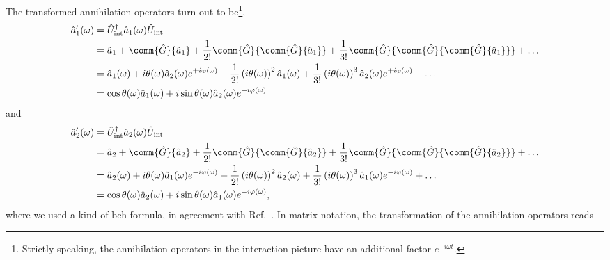 The transformed annihilation operators turn out to be\footnote{Strictly speaking, the annihilation operators in the interaction picture have an additional factor $e^{-i\omega t}$.},
\begin{equation}
	\begin{split}
		\hat{a}_1^\prime(\omega)
		&=
		\hat{U}_\text{int}^\dagger
		\hat{a}_1(\omega)
		\hat{U}_\text{int}
		\\
		&=
		\hat{a}_1
		+
		\comm{\hat{G}}{\hat{a}_1}
		+
		\frac{1}{2!}
		\comm{\hat{G}}{\comm{\hat{G}}{\hat{a}_1}}
		+
		\frac{1}{3!}
		\comm{\hat{G}}{\comm{\hat{G}}{\comm{\hat{G}}{\hat{a}_1}}}
		+
		\dots
		\\
		&=
		\hat{a}_1(\omega)
		+
		i\theta(\omega)
		\hat{a}_2(\omega)
		e^{+i\varphi(\omega)}
		+
		\frac{1}{2!}
		\left(i\theta(\omega)\right)^2
		\hat{a}_1(\omega)
		+
		\frac{1}{3!}
		\left(i\theta(\omega)\right)^3
		\hat{a}_2(\omega)
		e^{+i\varphi(\omega)}
		+
		\dots
		\\
		&=
		\cos\theta(\omega)
		\hat{a}_1(\omega)
		+
		i\sin\theta(\omega)
		\hat{a}_2(\omega)
		e^{+i\varphi(\omega)}
	\end{split}
\end{equation}
and
\begin{equation}
	\begin{split}
		\hat{a}_2^\prime(\omega)
		&=
		\hat{U}_\text{int}^\dagger
		\hat{a}_2(\omega)
		\hat{U}_\text{int}
		\\
		&=
		\hat{a}_2
		+
		\comm{\hat{G}}{\hat{a}_2}
		+
		\frac{1}{2!}
		\comm{\hat{G}}{\comm{\hat{G}}{\hat{a}_2}}
		+
		\frac{1}{3!}
		\comm{\hat{G}}{\comm{\hat{G}}{\comm{\hat{G}}{\hat{a}_2}}}
		+
		\dots
		\\
		&=
		\hat{a}_2(\omega)
		+
		i\theta(\omega)
		\hat{a}_1(\omega)
		e^{-i\varphi(\omega)}
		+
		\frac{1}{2!}
		\left(i\theta(\omega)\right)^2
		\hat{a}_2(\omega)
		+
		\frac{1}{3!}
		\left(i\theta(\omega)\right)^3
		\hat{a}_1(\omega)
		e^{-i\varphi(\omega)}
		+
		\dots
		\\
		&=
		\cos\theta(\omega)
		\hat{a}_2(\omega)
		+
		i\sin\theta(\omega)
		\hat{a}_1(\omega)
		e^{-i\varphi(\omega)}
		,
	\end{split}
\end{equation}
where we used a kind of \gls{bch} formula, in agreement with Ref.~\cite[p.~131]{Haroche2006}.
In matrix notation, the transformation of the annihilation operators reads
